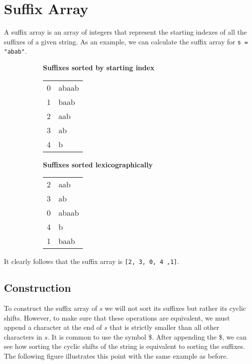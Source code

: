 \section{Suffix Array}
A suffix array is an array of integers that represent the starting indexes of
all the suffixes of a given string. As an example, we can calculate the
suffix array for \texttt{s = "abab"}. 
\begin{figure}[h!]
		\centering
		\begin{subfigure}[]{0.45\textwidth}
		\begin{center}
				\textbf{\footnotesize Suffixes sorted by starting index}
				\vspace{7pt}

				\ttfamily
		\begin{tabular}{rl}
				0 & abaab \\
				1 & baab \\
				2 & aab \\
				3 & ab \\
				4 & b \\
		\end{tabular}
				
		\end{center}
		\end{subfigure}
		\begin{subfigure}[]{0.45\textwidth}
		\begin{center}
				\textbf{\footnotesize Suffixes sorted lexicographically}
				\vspace{7pt}

				\ttfamily
		\begin{tabular}{rl}
				2 & aab \\
				3 & ab \\
				0 & abaab \\
				4 & b \\
				1 & baab \\
		\end{tabular}
				
		\end{center}
		\end{subfigure}

\end{figure}

It clearly follows that the suffix array is \texttt{[2, 3, 0, 4 ,1]}.

\subsection{Construction}
To construct the suffix array of $s$ we will not sort its suffixes but rather
its cyclic shifts. However, to make sure that these operations are
equivalent, we must append a character at the end of $s$ that is strictly
smaller than all other characters in $s$. It is common to use the symbol
\$. After appending the \$, we can see how sorting the cyclic shifts 
of the string is equivalent to sorting the suffixes. The following figure
illustrates this point with the same example as before.

